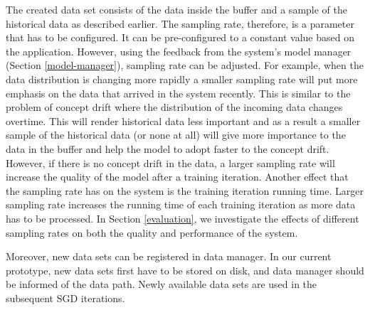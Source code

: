 \documentclass{vldb}
\begin{document}
The created data set consists of the data inside the buffer and a sample of the historical data as described earlier.
The sampling rate, therefore, is a parameter that has to be configured.
It can be pre-configured to a constant value based on the application.
However, using the feedback from the system's model manager (Section \ref{model-manager}), sampling rate can be adjusted.
For example, when the data distribution is changing more rapidly a smaller sampling rate will put more emphasis on the data that arrived in the system recently. 
This is similar to the problem of concept drift where the distribution of the incoming data changes overtime.
This will render historical data less important and as a result a smaller sample of the historical data (or none at all) will give more importance to the data in the buffer and help the model to adopt faster to the concept drift.
However, if there is no concept drift in the data, a larger sampling rate will increase the quality of the model after a training iteration.
Another effect that the sampling rate has on the system is the training iteration running time.
Larger sampling rate increases the running time of each training iteration as more data has to be processed.
In Section \ref{evaluation}, we investigate the effects of different sampling rates on both the quality and performance of the system.

Moreover,  new data sets can be registered in data manager.
In our current prototype, new data sets first have to be stored on disk, and data manager should be informed of the data path.
Newly available data sets are used in the subsequent SGD iterations.
\end{document}
